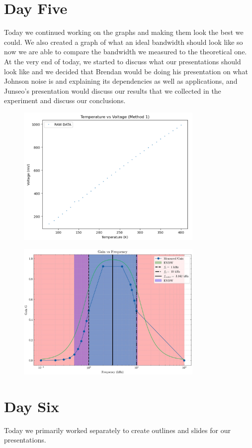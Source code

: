 \documentclass{article}
\begin{document}
\section*{Day Five}
Today we continued working on the graphs and making them look the best we could. We also created a graph of what an ideal bandwidth should look like so now we are able to compare the bandwidth we measured to the theoretical one. At the very end of today, we started to discuss what our presentations should look like and we decided that Brendan would be doing his presentation on what Johnson noise is and explaining its dependencies as well as applications, and Junseo's presentation would discuss our results that we collected in the experiment and discuss our conclusions. 
\begin{figure}[h]
    \centering
    \includegraphics[width=0.8\textwidth]{lab_notebook/tempvsNoise.PNG}
   
    \label{Section 1 data}
\end{figure}
\begin{figure}[h]
    \centering
    \includegraphics[width=0.8\textwidth]{lab_notebook/gain vs frequency.jpg}
   
    \label{Section 1 data}
\end{figure}
\section*{Day Six}
Today we primarily worked separately to create outlines and slides for our presentations. 


\nocite{PhysRev.21.483}
\end{document}
